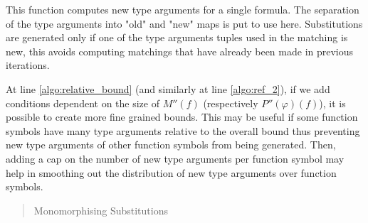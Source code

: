\documentclass[]{ceurart}
\begin{document}
This function computes new type arguments for a single formula. The separation of the type arguments into "old" and "new" maps is put to use here. Substitutions are generated only if one of the type arguments tuples used in the matching is new, this avoids computing matchings that have already been made in previous iterations.

At line \ref{algo:relative_bound} (and similarly at line \ref{algo:ref_2}), if we add conditions dependent on the size of \(M''(f)\) (respectively \(P''(\varphi)(f)\)), it is possible to create more fine grained bounds. This may be useful if some function symbols have many type arguments relative to the overall bound thus preventing new type arguments of other function symbols from being generated. Then, adding a cap on the number of new type arguments per function symbol may help in smoothing out the distribution of new type arguments over function symbols.


\begin{quote}
\begin{algorithm}
   \caption{Monomorphising Substitutions}


   \BlankLine



\end{algorithm}
\end{quote}
\end{document}

